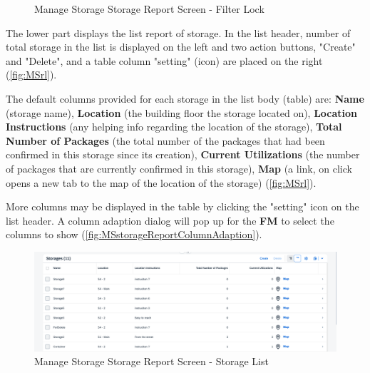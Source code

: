 \begin{figure}[H]
	\centering
    \vspace{5pt}
    \hspace{5pt}
    \caption{Manage Storage Storage Report Screen - Filter Lock}
	\label{fig:MSstorageReportFilterLock}
\end{figure}

\bigskip

The lower part displays the list report of storage. In the list header, number of total storage in the list is displayed on the left and two action buttons, "Create" and "Delete", and a table column "setting" (icon) are placed on the right (\autoref{fig:MSrl}).

The default columns provided for each storage in the list body (table) are: \textbf{Name} (storage name), \textbf{Location} (the building floor the storage located on), \textbf{Location Instructions} (any helping info regarding the location of the storage), \textbf{Total Number of Packages} (the total number of the packages that had been confirmed in this storage since its creation), \textbf{Current Utilizations} (the number of packages that are currently confirmed in this storage), \textbf{Map} (a link, on click opens a new tab to the map of the location of the storage) (\autoref{fig:MSrl}). 


More columns may be displayed in the table by clicking the "setting" icon on the list header. A column adaption dialog will pop up for the \textbf{FM} to select the columns to show (\autoref{fig:MSstorageReportColumnAdaption}).


\begin{figure}[htb] %
	\centering
	\includegraphics[width=1\linewidth]{images/user_doc/storage/StorageReportPage/reportList.png}
	\caption{Manage Storage Storage Report Screen - Storage List}
	\label{fig:MSrl}
\end{figure}

